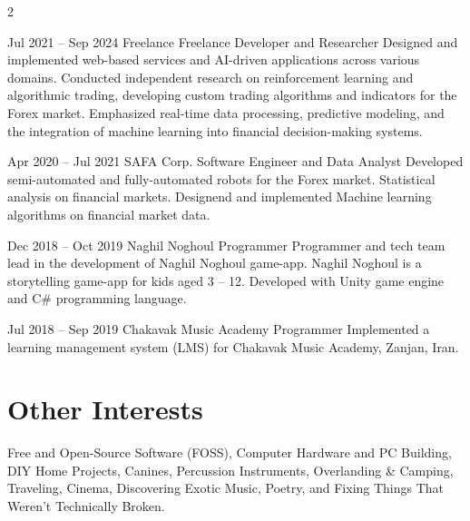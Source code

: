 \documentclass[
	8pt, %
]{FreemanCV}
\begin{document}
\begin{paracol}{2}

\jobentry
	{Jul 2021 -- Sep 2024} %
	{} %
	{Freelance} %
        {Freelance Developer and Researcher}%
	{Designed and implemented web-based services and AI-driven applications across various domains. Conducted independent research on reinforcement learning and algorithmic trading, developing custom trading algorithms and indicators for the Forex market. Emphasized real-time data processing, predictive modeling, and the integration of machine learning into financial decision-making systems.} %

    

\jobentry
	{Apr 2020 -- Jul 2021} %
	{} %
	{SAFA Corp.} %
	{Software Engineer and Data Analyst} %
	{Developed semi-automated and fully-automated robots for the Forex market. Statistical analysis on financial markets. Designend and implemented Machine learning algorithms on financial market data.} %

\jobentry
    {Dec 2018 -- Oct 2019} %
	{} %
	{Naghil Noghoul} %
	{Programmer} %
	{Programmer and tech team lead in the development of Naghil Noghoul game-app. Naghil Noghoul is a storytelling game-app for kids aged 3 – 12. Developed with Unity game engine and C\# programming language.} %

 
\jobentry
	{Jul 2018 -- Sep 2019} %
	{} %
	{Chakavak Music Academy} %
	{Programmer} %
	{Implemented a learning management system (LMS) for Chakavak Music Academy, Zanjan, Iran.} %
	



\section{Other Interests}
Free and Open-Source Software (FOSS), Computer Hardware and PC Building, DIY Home Projects, Canines, Percussion Instruments, Overlanding \& Camping, Traveling, Cinema, Discovering Exotic Music, Poetry, and Fixing Things That Weren't Technically Broken.


\end{paracol}
\end{document}
